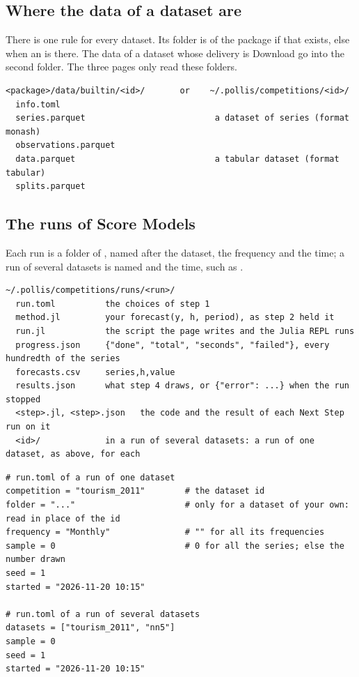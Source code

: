 \subsection{Where the data of a dataset are}

There is one rule for every dataset. Its folder is  of the package if that exists, else
 when an  is there. The data of a dataset whose delivery is Download go
into the second folder. The three pages only read these folders.

\begin{lstlisting}
<package>/data/builtin/<id>/       or    ~/.pollis/competitions/<id>/
  info.toml
  series.parquet                          a dataset of series (format monash)
  observations.parquet
  data.parquet                            a tabular dataset (format tabular)
  splits.parquet
\end{lstlisting}

\subsection{The runs of Score Models}

Each run is a folder of , named after the dataset, the frequency and the time; a run of several datasets is named
 and the time, such as .

\begin{lstlisting}
~/.pollis/competitions/runs/<run>/
  run.toml          the choices of step 1
  method.jl         your forecast(y, h, period), as step 2 held it
  run.jl            the script the page writes and the Julia REPL runs
  progress.json     {"done", "total", "seconds", "failed"}, every hundredth of the series
  forecasts.csv     series,h,value
  results.json      what step 4 draws, or {"error": ...} when the run stopped
  <step>.jl, <step>.json   the code and the result of each Next Step run on it
  <id>/             in a run of several datasets: a run of one dataset, as above, for each
\end{lstlisting}

\begin{lstlisting}
# run.toml of a run of one dataset
competition = "tourism_2011"        # the dataset id
folder = "..."                      # only for a dataset of your own: read in place of the id
frequency = "Monthly"               # "" for all its frequencies
sample = 0                          # 0 for all the series; else the number drawn
seed = 1
started = "2026-11-20 10:15"

# run.toml of a run of several datasets
datasets = ["tourism_2011", "nn5"]
sample = 0
seed = 1
started = "2026-11-20 10:15"
\end{lstlisting}

